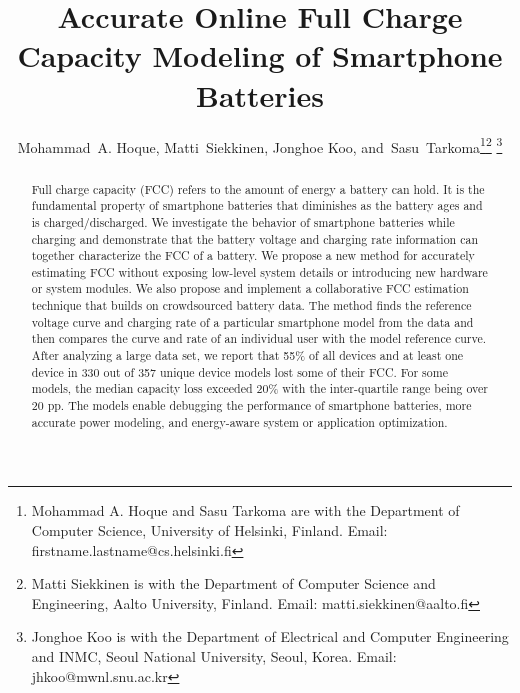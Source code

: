 \documentclass[journal]{IEEEtran}
\begin{document}
\sloppy
\title{Accurate Online Full Charge Capacity Modeling of Smartphone Batteries}


\author{Mohammad~A. Hoque,
        Matti~Siekkinen,
        Jonghoe Koo,
        and~Sasu~Tarkoma\thanks{Mohammad A. Hoque and Sasu Tarkoma are with the Department of 
Computer Science, University of Helsinki, Finland. Email: firstname.lastname@cs.helsinki.fi}\thanks{Matti Siekkinen is with the Department of Computer Science and Engineering, Aalto University, Finland. Email: matti.siekkinen@aalto.fi}
\thanks{Jonghoe Koo is with the Department of Electrical and Computer Engineering and INMC, Seoul National University, Seoul, Korea. Email: jhkoo@mwnl.snu.ac.kr}
}



















\maketitle


\begin{abstract}



Full charge capacity (FCC) refers to the amount of energy a battery can hold. It is the fundamental property of smartphone batteries that diminishes as the battery ages and is charged/discharged. We investigate the behavior of smartphone batteries while charging and demonstrate that the battery voltage and charging rate information can together characterize the FCC of a battery. We propose a new method for accurately estimating FCC without exposing low-level system details or introducing new hardware or system modules. We also propose  and implement a collaborative FCC estimation technique that builds on crowdsourced battery data. The method finds the reference voltage curve and charging rate of a particular smartphone model from the data and then compares the curve and rate of an individual user with the model reference curve. After analyzing a large data set, we report that 55\% of all devices and at least one device in 330 out of 357 unique device models  lost some of their FCC. For some models, the median capacity loss exceeded 20\% with the inter-quartile range being over 20 pp.  The models enable debugging the performance of smartphone batteries, more accurate power modeling, and energy-aware system or application optimization. 
\end{abstract}
\end{document}

